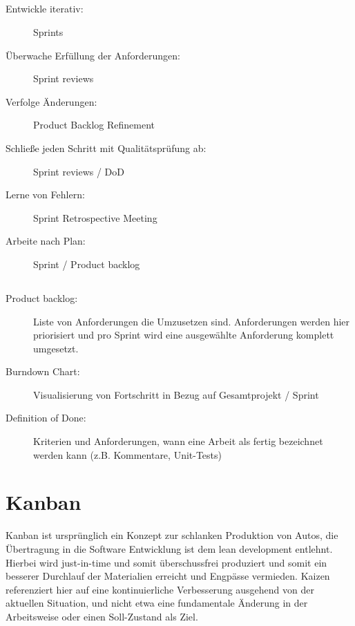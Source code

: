 \documentclass{scrartcl}
\begin{document}
\subsection{}
\begin{description}
  \item[Entwickle iterativ:] Sprints
  \item[Überwache Erfüllung der Anforderungen:] Sprint reviews
  \item[Verfolge Änderungen:] Product Backlog Refinement
  \item[Schließe jeden Schritt mit Qualitätsprüfung ab:] Sprint reviews / DoD
  \item[Lerne von Fehlern:] Sprint Retrospective Meeting 
  \item[Arbeite nach Plan:] Sprint / Product backlog
\end{description}

\subsection{}
\begin{description}
  \item[Product backlog:]  Liste von Anforderungen die Umzusetzen sind. Anforderungen werden hier priorisiert und pro Sprint wird eine ausgewählte Anforderung komplett umgesetzt.
  \item[Burndown Chart:] Visualisierung von Fortschritt in Bezug auf Gesamtprojekt / Sprint
  \item[Definition of Done:] Kriterien und Anforderungen, wann eine Arbeit als fertig bezeichnet werden kann (z.B. Kommentare, Unit-Tests)
\end{description}


\section{Kanban}
Kanban ist ursprünglich ein Konzept zur schlanken Produktion von Autos, die Übertragung in die Software Entwicklung ist dem lean development entlehnt. Hierbei wird just-in-time und somit überschussfrei produziert und somit ein besserer Durchlauf der Materialien erreicht und Engpässe vermieden. Kaizen referenziert hier auf eine kontinuierliche Verbesserung ausgehend von der aktuellen Situation, und nicht etwa eine fundamentale Änderung in der Arbeitsweise oder einen Soll-Zustand als Ziel.
\end{document}
